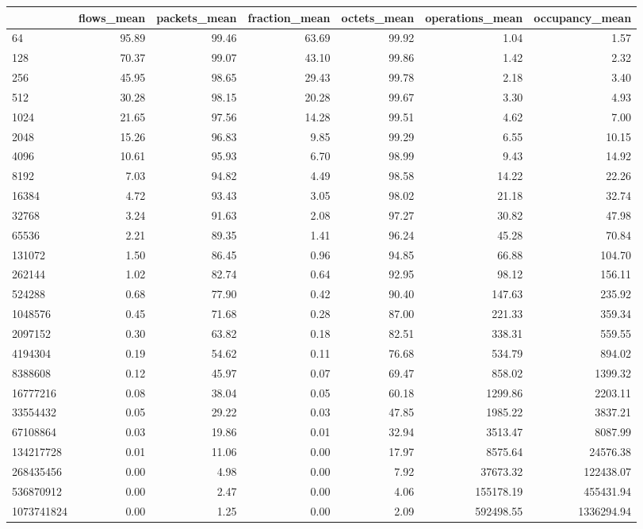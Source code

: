 \begin{tabular}{lrrrrrr}
\toprule
 & flows_mean & packets_mean & fraction_mean & octets_mean & operations_mean & occupancy_mean \\
\midrule
64 & 95.89 & 99.46 & 63.69 & 99.92 & 1.04 & 1.57 \\
128 & 70.37 & 99.07 & 43.10 & 99.86 & 1.42 & 2.32 \\
256 & 45.95 & 98.65 & 29.43 & 99.78 & 2.18 & 3.40 \\
512 & 30.28 & 98.15 & 20.28 & 99.67 & 3.30 & 4.93 \\
1024 & 21.65 & 97.56 & 14.28 & 99.51 & 4.62 & 7.00 \\
2048 & 15.26 & 96.83 & 9.85 & 99.29 & 6.55 & 10.15 \\
4096 & 10.61 & 95.93 & 6.70 & 98.99 & 9.43 & 14.92 \\
8192 & 7.03 & 94.82 & 4.49 & 98.58 & 14.22 & 22.26 \\
16384 & 4.72 & 93.43 & 3.05 & 98.02 & 21.18 & 32.74 \\
32768 & 3.24 & 91.63 & 2.08 & 97.27 & 30.82 & 47.98 \\
65536 & 2.21 & 89.35 & 1.41 & 96.24 & 45.28 & 70.84 \\
131072 & 1.50 & 86.45 & 0.96 & 94.85 & 66.88 & 104.70 \\
262144 & 1.02 & 82.74 & 0.64 & 92.95 & 98.12 & 156.11 \\
524288 & 0.68 & 77.90 & 0.42 & 90.40 & 147.63 & 235.92 \\
1048576 & 0.45 & 71.68 & 0.28 & 87.00 & 221.33 & 359.34 \\
2097152 & 0.30 & 63.82 & 0.18 & 82.51 & 338.31 & 559.55 \\
4194304 & 0.19 & 54.62 & 0.11 & 76.68 & 534.79 & 894.02 \\
8388608 & 0.12 & 45.97 & 0.07 & 69.47 & 858.02 & 1399.32 \\
16777216 & 0.08 & 38.04 & 0.05 & 60.18 & 1299.86 & 2203.11 \\
33554432 & 0.05 & 29.22 & 0.03 & 47.85 & 1985.22 & 3837.21 \\
67108864 & 0.03 & 19.86 & 0.01 & 32.94 & 3513.47 & 8087.99 \\
134217728 & 0.01 & 11.06 & 0.00 & 17.97 & 8575.64 & 24576.38 \\
268435456 & 0.00 & 4.98 & 0.00 & 7.92 & 37673.32 & 122438.07 \\
536870912 & 0.00 & 2.47 & 0.00 & 4.06 & 155178.19 & 455431.94 \\
1073741824 & 0.00 & 1.25 & 0.00 & 2.09 & 592498.55 & 1336294.94 \\
\bottomrule
\end{tabular}
